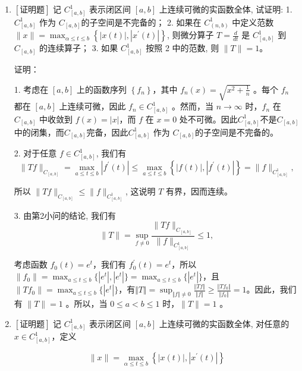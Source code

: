 \documentclass{article}
\begin{document}
\begin{enumerate}
    \item $\left[\textbf{证明题}\right]$ 记 $C_{[a, b]}^1$ 表示闭区间 $[a, b]$ 上连续可微的实函数全体, 试证明: 1. $C_{[a, b]}^1$ 作为 $C_{[a, b]}$的子空间是不完备的； 2. 如果在 $C_{(n, b)}^1$ 中定义范数 $\|x\|=\max _{\alpha \leq t \leq b}\left\{|x(t)|,\left|x^{\prime}(t)\right|\right\}$, 则微分算子 $T=\frac{d}{d t}$ 是 $C_{[a, b]}^1$ 到 $C_{[a, b]}$ 的连续算子； 3. 如果 $C_{[a, b]}^1$ 按照 2 中的范数, 则 $\|T\|=1$。

    证明：
    
    1. 考虑在 $[a, b]$ 上的函数序列 $\left\{f_n\right\}$，其中 $f_n(x)=\sqrt{x^2+\frac{1}{n}}$ 。每个 $f_n$ 都在 $[a, b]$ 上连续可微，因此 $f_n \in C_{[a, b]}^1$ 。然而，当 $n \rightarrow \infty$ 时，$f_n$ 在 $C_{[a, b]}$ 中收敛到 $f(x)=|x|$，而 $f$ 在 $x=0$ 处不可微。因此$C_{[a, b]}^1$不是$C_{[a, b]}$中的闭集，而$C_{[a, b]}$完备，因此$C_{[a, b]}^1$ 作为 $C_{[a, b]}$的子空间是不完备的。
    
2. 对于任意 $f \in C_{[a, b]}^1$, 我们有
$$
\|T f\|_{C_{[a, b]}}=\max _{a \leq t \leq b}\left|f^{\prime}(t)\right| \leq \max _{a \leq t \leq b}\left\{|f(t)|,\left|f^{\prime}(t)\right|\right\}=\|f\|_{C_{[a, b]}^1},
$$

所以 $\|T f\|_{C_{[a, b]}} \leq\|f\|_{C_{[a, b]}^1}$, 这说明 $T$ 有界，因而连续。

3. 由第2小问的结论, 我们有
$$
\|T\|=\sup _{f \neq 0} \frac{\|T f\|_{C_{[a, b]}}}{\|f\|_{C_{[a, b]}^1}} \leq 1,
$$

考虑函数 $f_0(t)=e^t$，我们有 $f_0^{\prime}(t)=e^t$，所以 $\|f_0\|=\max _{a \leq t \leq b}\{|e^t|,|e^t|\}=\max _{a \leq t \leq b}\{|e^t|\}$，且 $\|T f_0\|=\max _{a \leq t \leq b}\{|e^t|\}$，有$\Vert T \Vert = \sup_{\Vert f \Vert \neq 0}\frac{\Vert Tf \Vert}{\Vert f \Vert} \geq \frac{\Vert Tf_0 \Vert}{\Vert f_0 \Vert} = 1$。因此，我们有 $\|T\|=1$ 。所以，当 $0 \leq a<b \leq 1$ 时，$\|T\|=1$ 。



    \item $\left[\textbf{证明题}\right]$ 记 $C_{[a, b]}^1$ 表示闭区间 $[a, b]$ 上连续可微的实函数全体, 对任意的$x \in C_{[a, b]}^1$，定义

    $$
    \|x\|=\max _{\alpha \leq t \leq b}\left\{|x(t)|,\left|x^{\prime}(t)\right|\right\}
    $$
    

\end{enumerate}
\end{document}
